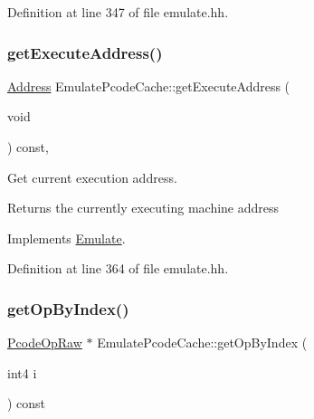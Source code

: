 Definition at line 347 of file emulate.\+hh.

\mbox{\label{class_emulate_pcode_cache_a0552fb840bb762ee41b4bbc7fce2b608}} 
\subsubsection{\texorpdfstring{getExecuteAddress()}{getExecuteAddress()}}
{\footnotesize\ttfamily \mbox{\hyperlink{class_address}{Address}} Emulate\+Pcode\+Cache\+::get\+Execute\+Address (\begin{DoxyParamCaption}\item[{void}]{ }\end{DoxyParamCaption}) const\hspace{0.3cm}{\ttfamily [inline]}, {\ttfamily [virtual]}}



Get current execution address. 

\begin{DoxyReturn}{Returns}
the currently executing machine address 
\end{DoxyReturn}


Implements \mbox{\hyperlink{class_emulate_aeca3c773876b391304afffe2a5eff9de}{Emulate}}.



Definition at line 364 of file emulate.\+hh.

\mbox{\label{class_emulate_pcode_cache_ae96cdbb6e6128965335fb7cddb20500b}} 
\subsubsection{\texorpdfstring{getOpByIndex()}{getOpByIndex()}}
{\footnotesize\ttfamily \mbox{\hyperlink{class_pcode_op_raw}{Pcode\+Op\+Raw}} $\ast$ Emulate\+Pcode\+Cache\+::get\+Op\+By\+Index (\begin{DoxyParamCaption}\item[{int4}]{i }\end{DoxyParamCaption}) const\hspace{0.3cm}{\ttfamily [inline]}}



